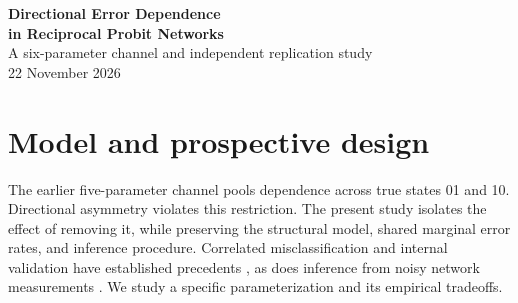 \documentclass[10pt]{article}
\begin{document}
\begin{center}
{\Large\bfseries\color{navy}Directional Error Dependence\\in Reciprocal Probit Networks}\\[4pt]
{\normalsize A six-parameter channel and independent replication study}\\[5pt]
{\small 22 November 2026}
\end{center}
\begin{abstract}\noindent
We relax the equality of measurement-error correlations for true dyad states 01 and 10. The resulting channel has six measurement parameters, compared with five for the pooled model and twelve for an unrestricted channel. We evaluate 800 fresh simulated networks under asymmetric and symmetric dependence, using paired audit budgets. In the primary asymmetric scenario, the Six/Full RMSE ratio for structural reciprocity is \SameRatio{} \SameCI{} at equal budgets and \HalfRatio{} \HalfCI{} at half the audit budget. The respective prespecified retention rules are \SameResult{} and \HalfResult{}. We separately report channel recovery, prior sensitivity, and numerical diagnostics. The results concern the specified synthetic mechanisms and do not establish external validity on real networks.
\end{abstract}
\section{Model and prospective design}
The earlier five-parameter channel pools dependence across true states 01 and 10. Directional asymmetry violates this restriction. The present study isolates the effect of removing it, while preserving the structural model, shared marginal error rates, and inference procedure. Correlated misclassification and internal validation have established precedents \cite{roy,tang}, as does inference from noisy network measurements \cite{newman}. We study a specific parameterization and its empirical tradeoffs.
\end{document}
